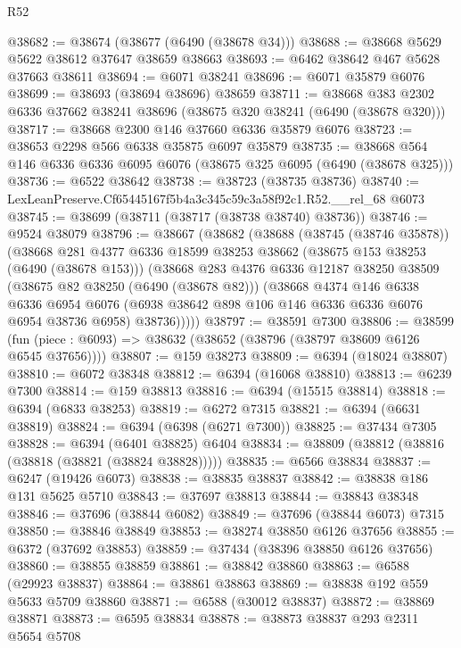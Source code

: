 \begin{lexlean}{R52}
\begin{coremodule}
@38682 := @38674 (@38677 (@6490 (@38678 @34)))
@38688 := @38668 @5629 @5622 @38612 @37647 @38659 @38663
@38693 := @6462 @38642 @467 @5628 @37663 @38611
@38694 := @6071 @38241
@38696 := @6071 @35879 @6076
@38699 := @38693 (@38694 @38696) @38659
@38711 := @38668 @383 @2302 @6336 @37662 @38241 @38696 (@38675 @320 @38241 (@6490 (@38678 @320)))
@38717 := @38668 @2300 @146 @37660 @6336 @35879 @6076
@38723 := @38653 @2298 @566 @6338 @35875 @6097 @35879
@38735 := @38668 @564 @146 @6336 @6336 @6095 @6076 (@38675 @325 @6095 (@6490 (@38678 @325)))
@38736 := @6522 @38642
@38738 := @38723 (@38735 @38736)
@38740 := LexLeanPreserve.Cf65445167f5b4a3c345c59c3a58f92c1.R52.__rel_68 @6073
@38745 := @38699 (@38711 (@38717 (@38738 @38740) @38736))
@38746 := @9524 @38079
@38796 := @38667
    (@38682
      (@38688
        (@38745 (@38746 @35878))
        (@38668
          @281
          @4377
          @6336
          @18599
          @38253
          @38662
          (@38675 @153 @38253 (@6490 (@38678 @153)))
          (@38668
            @283
            @4376
            @6336
            @12187
            @38250
            @38509
            (@38675 @82 @38250 (@6490 (@38678 @82)))
            (@38668
              @4374
              @146
              @6338
              @6336
              @6954
              @6076
              (@6938 @38642 @898 @106 @146 @6336 @6336 @6076 @6954 @38736 @6958)
              @38736)))))
@38797 := @38591 @7300
@38806 := @38599
    (fun (piece : @6093) => @38632 (@38652 (@38796 (@38797 @38609 @6126 @6545 @37656))))
@38807 := @159 @38273
@38809 := @6394 (@18024 @38807)
@38810 := @6072 @38348
@38812 := @6394 (@16068 @38810)
@38813 := @6239 @7300
@38814 := @159 @38813
@38816 := @6394 (@15515 @38814)
@38818 := @6394 (@6833 @38253)
@38819 := @6272 @7315
@38821 := @6394 (@6631 @38819)
@38824 := @6394 (@6398 (@6271 @7300))
@38825 := @37434 @7305
@38828 := @6394 (@6401 @38825) @6404
@38834 := @38809 (@38812 (@38816 (@38818 (@38821 (@38824 @38828)))))
@38835 := @6566 @38834
@38837 := @6247 (@19426 @6073)
@38838 := @38835 @38837
@38842 := @38838 @186 @131 @5625 @5710
@38843 := @37697 @38813
@38844 := @38843 @38348
@38846 := @37696 (@38844 @6082)
@38849 := @37696 (@38844 @6073) @7315
@38850 := @38846 @38849
@38853 := @38274 @38850 @6126 @37656
@38855 := @6372 (@37692 @38853)
@38859 := @37434 (@38396 @38850 @6126 @37656)
@38860 := @38855 @38859
@38861 := @38842 @38860
@38863 := @6588 (@29923 @38837)
@38864 := @38861 @38863
@38869 := @38838 @192 @559 @5633 @5709 @38860
@38871 := @6588 (@30012 @38837)
@38872 := @38869 @38871
@38873 := @6595 @38834
@38878 := @38873 @38837 @293 @2311 @5654 @5708

\end{coremodule}
\end{lexlean}

